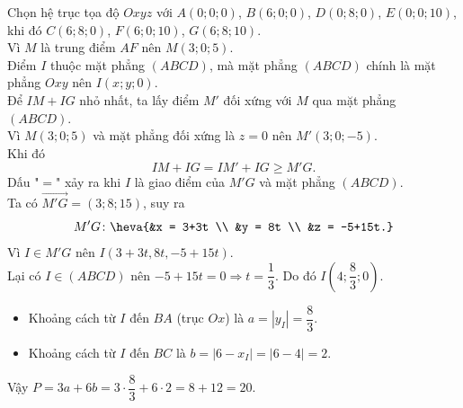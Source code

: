 \begin{ex}
{\begin{center}
		\end{center}
		Chọn hệ trục tọa độ $Oxyz$ với $A(0;0;0)$, $B(6;0;0)$, $D(0;8;0)$, $E(0;0;10)$, khi đó $C(6;8;0)$, $F(6;0;10)$, $G(6;8;10)$.\\
		Vì $M$ là trung điểm $AF$ nên $M(3;0;5)$.\\
		Điểm $I$ thuộc mặt phẳng $(ABCD)$, mà mặt phẳng $(ABCD)$ chính là mặt phẳng $Oxy$ nên $I(x;y;0)$.\\
		Để $IM+IG$ nhỏ nhất, ta lấy điểm $M'$ đối xứng với $M$ qua mặt phẳng $(ABCD)$.\\
		Vì $M(3;0;5)$ và mặt phẳng đối xứng là $z=0$ nên $M'(3;0;-5)$.\\
		Khi đó $$IM+IG = IM'+IG \geq M'G.$$
		Dấu "$=$" xảy ra khi $I$ là giao điểm của $M'G$ và mặt phẳng $(ABCD)$.\\
		Ta có $\overrightarrow{M'G} = (3;8;15)$, suy ra
		$$M'G \colon \heva {&x = 3+3t \\ &y = 8t \\ &z = -5+15t.}$$
		Vì $I \in M'G$ nên $I(3+3t,8t,-5+15t)$.\\
		Lại có $I \in (ABCD)$ nên $-5+15t = 0 \Rightarrow t = \dfrac{1}{3}$. Do đó $I(4; \dfrac{8}{3}; 0)$.
		\begin{itemize}
			\item Khoảng cách từ $I$ đến $BA$ (trục $Ox$) là $a = \left| y_I \right| = \dfrac{8}{3}$.
			\item Khoảng cách từ $I$ đến $BC$ là $b = \left| 6 - x_I \right| = \left| 6 - 4 \right| = 2$.
		\end{itemize}
		Vậy $P = 3a + 6b = 3 \cdot \dfrac{8}{3} + 6 \cdot 2 = 8 + 12 = 20$.}
\end{ex}
